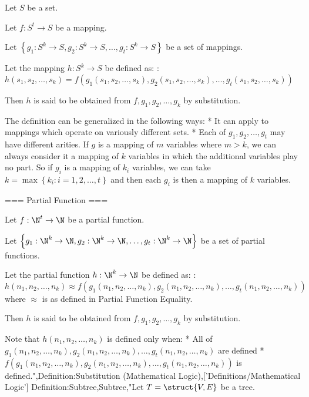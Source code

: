Let $S$ be a set.

Let $f: S^t \to S$ be a mapping.

Let $\left\{{g_1: S^k \to S, g_2: S^k \to S, \ldots, g_t: S^k \to S}\right\}$ be a set of mappings.

Let the mapping $h: S^k \to S$ be defined as:
:$h \left({s_1, s_2, \ldots, s_k}\right) = f \left({g_1 \left({s_1, s_2, \ldots, s_k}\right), g_2 \left({s_1, s_2, \ldots, s_k}\right), \ldots, g_t \left({s_1, s_2, \ldots, s_k}\right)}\right)$


Then $h$ is said to be obtained from $f, g_1, g_2, \ldots, g_k$ by substitution.


The definition can be generalized in the following ways:
* It can apply to mappings which operate on variously different sets.
* Each of $g_1, g_2, \ldots, g_t$ may have different arities. If $g$ is a mapping of $m$ variables where $m > k$, we can always consider it a mapping of $k$ variables in which the additional variables play no part. So if $g_i$ is a mapping of $k_i$ variables, we can take $k = \max \left\{{k_i: i = 1, 2, \ldots, t}\right\}$ and then each $g_i$ is then a mapping of $k$ variables.


=== Partial Function ===

Let $f: \N^t \to \N$ be a partial function.

Let $\left\{{g_1: \N^k \to \N, g_2: \N^k \to \N, \ldots, g_t: \N^k \to \N}\right\}$ be a set of partial functions.

Let the partial function $h: \N^k \to \N$ be defined as:
:$h \left({n_1, n_2, \ldots, n_k}\right) \approx f \left({g_1 \left({n_1, n_2, \ldots, n_k}\right), g_2 \left({n_1, n_2, \ldots, n_k}\right), \ldots, g_t \left({n_1, n_2, \ldots, n_k}\right)}\right)$
where $\approx$ is as defined in Partial Function Equality.


Then $h$ is said to be obtained from $f, g_1, g_2, \ldots, g_k$ by substitution.


Note that $h \left({n_1, n_2, \ldots, n_k}\right)$ is defined only when:
* All of $g_1 \left({n_1, n_2, \ldots, n_k}\right), g_2 \left({n_1, n_2, \ldots, n_k}\right), \ldots, g_t \left({n_1, n_2, \ldots, n_k}\right)$ are defined
* $f \left({g_1 \left({n_1, n_2, \ldots, n_k}\right), g_2 \left({n_1, n_2, \ldots, n_k}\right), \ldots, g_t \left({n_1, n_2, \ldots, n_k}\right)}\right)$ is defined.",Definition:Substitution (Mathematical Logic),['Definitions/Mathematical Logic']
Definition:Subtree,Subtree,"Let $T = \struct {V, E}$ be a tree.



